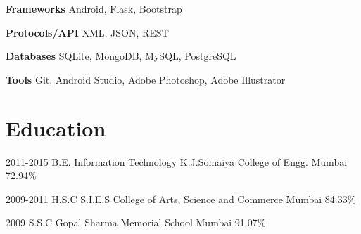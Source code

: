 \documentclass[10pt, a4paper, sans]{moderncv}
\begin{document}
\cvitem
{\bfseries{Frameworks}}
{Android, Flask, Bootstrap}

\cvitem
{\bfseries{Protocols/API}}
{XML, JSON, REST}

\cvitem
{\bfseries{Databases}}
{SQLite, MongoDB, MySQL, PostgreSQL}

\cvitem
{\bfseries{Tools}}
{Git, Android Studio, Adobe Photoshop, Adobe Illustrator}

\section{Education}
\cventry
{2011-2015}
{B.E. Information Technology}
{K.J.Somaiya College of Engg.}
{Mumbai}
{72.94\%}
{}

\cventry
{2009-2011}
{H.S.C}
{S.I.E.S College of Arts, Science and Commerce}
{Mumbai}
{84.33\%}
{}

\cventry
{2009}
{S.S.C}
{Gopal Sharma Memorial School}
{Mumbai}
{91.07\%}
{}
\end{document}
